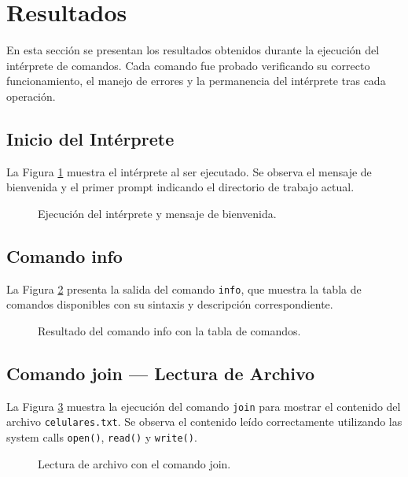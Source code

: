 \newpage
\section{Resultados}
    En esta sección se presentan los resultados obtenidos durante la ejecución del intérprete de comandos. Cada comando fue probado verificando su correcto funcionamiento, el manejo de errores y la permanencia del intérprete tras cada operación.

    \subsection{Inicio del Intérprete}
        La Figura \ref{fig:inicio} muestra el intérprete al ser ejecutado. Se observa el mensaje de bienvenida y el primer prompt indicando el directorio de trabajo actual.
        \begin{figure}[!h]
            \centering
            \caption{Ejecución del intérprete y mensaje de bienvenida.}
            \label{fig:inicio}
        \end{figure}

    \subsection{Comando info}
        La Figura \ref{fig:info} presenta la salida del comando \texttt{info}, que muestra la tabla de comandos disponibles con su sintaxis y descripción correspondiente.
        \begin{figure}[!h]
            \centering
            \caption{Resultado del comando info con la tabla de comandos.}
            \label{fig:info}
        \end{figure}

    \subsection{Comando join — Lectura de Archivo}
        La Figura \ref{fig:join_read} muestra la ejecución del comando \texttt{join} para mostrar el contenido del archivo \texttt{celulares.txt}. Se observa el contenido leído correctamente utilizando las system calls \texttt{open()}, \texttt{read()} y \texttt{write()}.
        \begin{figure}[!h]
            \centering
            \caption{Lectura de archivo con el comando join.}
            \label{fig:join_read}
        \end{figure}

